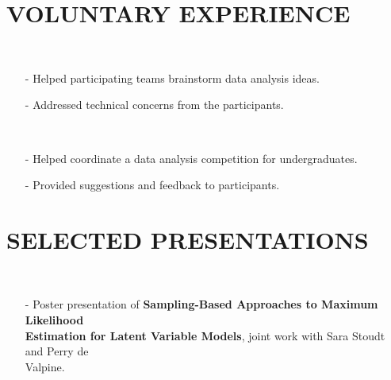 \documentclass{res}
\begin{document}
\begin{resume}
\section{VOLUNTARY EXPERIENCE}   
  \\ 
    \begin{itemize}\setlength\itemsep{0em}
    \item[-] Helped participating teams brainstorm data analysis ideas.
    \item[-] Addressed technical concerns from the participants.
    \end{itemize}

  \\ 
    \begin{itemize}\setlength\itemsep{0em}
    \item[-] Helped coordinate a data analysis competition for undergraduates.
    \item[-] Provided suggestions and feedback to participants.
    \end{itemize}
    
\section{SELECTED PRESENTATIONS}
  \\ 
    \begin{itemize}\setlength\itemsep{0em}
    \item[-] Poster presentation of \textbf{Sampling-Based Approaches to Maximum Likelihood \\Estimation for Latent Variable Models}, joint work with Sara Stoudt and Perry de \\Valpine.
    \end{itemize}
    

\end{resume}
\end{document}
